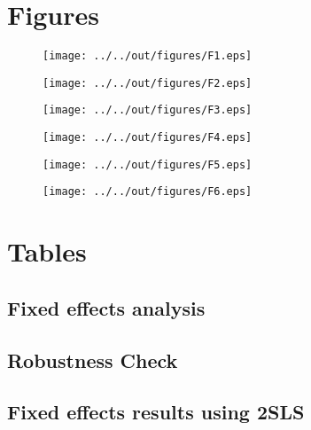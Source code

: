 \documentclass[11pt, a4paper, leqno]{article}
\begin{document}



\newpage{}

\section{Figures}
\label{sec:Figures}


\begin{figure}[!htbp]
	\texttt{[image: ../../out/figures/F1.eps]}
\end{figure}


\begin{figure}[!htbp]
	\texttt{[image: ../../out/figures/F2.eps]}
\end{figure}
\begin{figure}[!htbp]
    \texttt{[image: ../../out/figures/F3.eps]}
\end{figure}
\begin{figure}[!htbp]
    \texttt{[image: ../../out/figures/F4.eps]}
\end{figure}
\begin{figure}[!htbp]
    \texttt{[image: ../../out/figures/F5.eps]}
\end{figure}
\begin{figure}[!htbp]
    \texttt{[image: ../../out/figures/F6.eps]}
\end{figure}


\clearpage

\section{Tables}

\subsection{Fixed effects analysis}




\clearpage

\subsection{Robustness Check}




\clearpage


\subsection{Fixed effects results using 2SLS}
\end{document}
